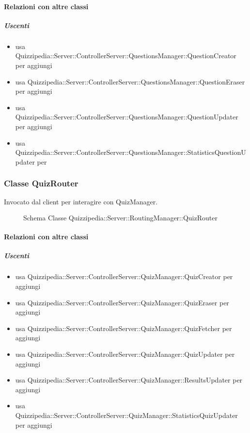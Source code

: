 \paragraph{Relazioni con altre classi}
\subparagraph{Uscenti}
\begin{itemize}
\item usa Quizzipedia::Server::ControllerServer::QuestionsManager::QuestionCreator per aggiungi
\item usa Quizzipedia::Server::ControllerServer::QuestionsManager::QuestionEraser per aggiungi
\item usa Quizzipedia::Server::ControllerServer::QuestionsManager::QuestionUpdater per aggiungi
\item usa Quizzipedia::Server::ControllerServer::QuestionsManager::StatisticsQuestionUpdater per 
\end{itemize}
\subsubsection{Classe QuizRouter}
Invocato dal client per interagire con QuizManager.
\begin{figure}[H]
\centering
\noindent{}
\caption[Schema Classe QuizRouter]{Schema Classe Quizzipedia::Server::RoutingManager::QuizRouter}
\end{figure}
\paragraph{Relazioni con altre classi}
\subparagraph{Uscenti}
\begin{itemize}
\item usa Quizzipedia::Server::ControllerServer::QuizManager::QuizCreator per aggiungi
\item usa Quizzipedia::Server::ControllerServer::QuizManager::QuizEraser per aggiungi
\item usa Quizzipedia::Server::ControllerServer::QuizManager::QuizFetcher per aggiungi
\item usa Quizzipedia::Server::ControllerServer::QuizManager::QuizUpdater per aggiungi
\item usa Quizzipedia::Server::ControllerServer::QuizManager::ResultsUpdater per aggiungi
\item usa Quizzipedia::Server::ControllerServer::QuizManager::StatisticsQuizUpdater per aggiungi
\end{itemize}
